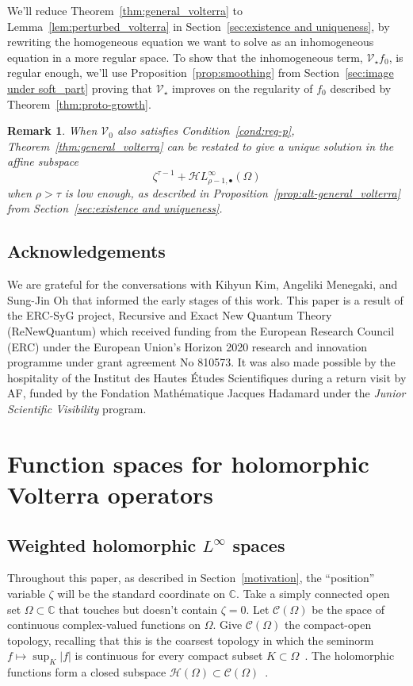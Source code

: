 \documentclass{article}
\theoremstyle{plain}
\newtheorem{rmk}{Remark}
\newcommand{\C}{\mathbb{C}}
\newcommand{\cont}{\mathcal{C}}
\newcommand{\holo}{\mathcal{H}}
\newcommand{\singexp}[2]{\mathcal{H}L^\infty_{#1, #2}}
\newcommand{\singexpalg}[1]{\singexp{#1}{\bullet}}
\newcommand{\hardpart}{\mathcal{V}_0}
\newcommand{\softpart}{\mathcal{V}_\star}
\newcommand{\domain}{\Omega}
\begin{document}
We'll reduce Theorem~\ref{thm:general_volterra} to Lemma~\ref{lem:perturbed_volterra} in Section~\ref{sec:existence and uniqueness}, by rewriting the homogeneous equation we want to solve as an inhomogeneous equation in a more regular space. To show that the inhomogeneous term, $\softpart f_0$, is regular enough, we'll use Proposition~\ref{prop:smoothing} from Section~\ref{sec:image under soft_part} proving that $\softpart$ improves on the regularity of $f_0$ described by Theorem~\ref{thm:proto-growth}.

\begin{rmk}
When $\hardpart$ also satisfies Condition~\eqref{cond:reg-p}, Theorem~\ref{thm:general_volterra} can be restated to give a unique solution in the affine subspace
\[ \zeta^{\tau-1} + \singexpalg{\rho-1}(\domain) \]
when $\rho > \tau$ is low enough, as described in Proposition~\ref{prop:alt-general_volterra} from Section~\ref{sec:existence and uniqueness}.
\end{rmk}
\subsection{Acknowledgements}
We are grateful for the conversations with Kihyun Kim, Angeliki Menegaki, and Sung-Jin Oh that informed the early stages of this work. This paper is a result of the ERC-SyG project, Recursive and Exact New Quantum Theory (ReNewQuantum) which received funding from the European Research Council (ERC) under the European Union's Horizon 2020 research and innovation programme under grant agreement No 810573. It was also made possible by the hospitality of the Institut des Hautes \'{E}tudes Scientifiques during a return visit by AF, funded by the Fondation Math\'{e}matique Jacques Hadamard under the \textit{Junior Scientific Visibility} program.
\section{Function spaces for holomorphic Volterra operators}\label{fn-spaces}
\subsection{Weighted holomorphic $L^{\infty}$ spaces}\label{sec:fn-space-defs}
Throughout this paper, as described in Section~\ref{motivation}, the ``position'' variable $\zeta$ will be the standard coordinate on $\C$. Take a simply connected open set $\Omega \subset \C$ that touches but doesn't contain $\zeta = 0$. Let $\cont(\Omega)$ be the space of continuous complex-valued functions on $\Omega$. Give $\cont(\Omega)$ the compact-open topology, recalling that this is the coarsest topology in which the seminorm $f \mapsto \sup_K |f|$ is continuous for every compact subset $K \subset \Omega$~\cite[Example~2.6 and \S 4 notes]{fnl-cpx-anal}. The holomorphic functions form a closed subspace $\holo(\Omega) \subset \cont(\Omega)$~\cite[Proposition~3.14]{fnl-cpx-anal}.
\end{document}
